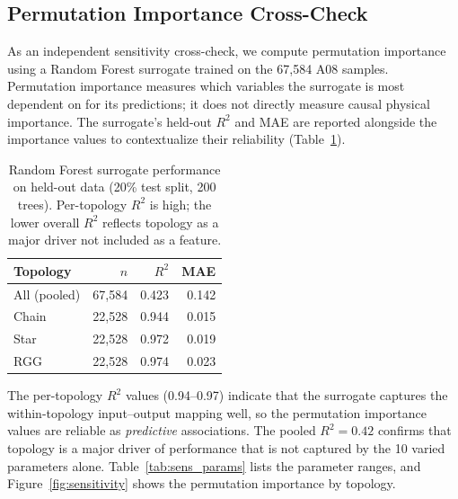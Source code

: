 \documentclass[quantumrep,article,submit,moreauthors]{Definitions/mdpi}
\begin{document}
\subsection{Permutation Importance Cross-Check}

As an independent sensitivity cross-check, we compute permutation importance using a Random Forest surrogate trained on the 67{,}584 A08 samples. Permutation importance measures which variables the surrogate is most dependent on for its predictions; it does not directly measure causal physical importance. The surrogate's held-out $R^2$ and MAE are reported alongside the importance values to contextualize their reliability (Table~\ref{tab:rf_r2}).

\begin{table}[htbp]
\centering
\caption{Random Forest surrogate performance on held-out data (20\% test split, 200 trees). Per-topology $R^2$ is high; the lower overall $R^2$ reflects topology as a major driver not included as a feature.}
\label{tab:rf_r2}
\begin{tabular}{lrrr}
\toprule
Topology & $n$ & $R^2$ & MAE \\
\midrule
All (pooled) & 67{,}584 & 0.423 & 0.142 \\
Chain & 22{,}528 & 0.944 & 0.015 \\
Star & 22{,}528 & 0.972 & 0.019 \\
RGG & 22{,}528 & 0.974 & 0.023 \\
\bottomrule
\end{tabular}
\end{table}

The per-topology $R^2$ values (0.94--0.97) indicate that the surrogate captures the within-topology input--output mapping well, so the permutation importance values are reliable as \emph{predictive} associations. The pooled $R^2 = 0.42$ confirms that topology is a major driver of performance that is not captured by the 10 varied parameters alone. Table~\ref{tab:sens_params} lists the parameter ranges, and Figure~\ref{fig:sensitivity} shows the permutation importance by topology.
\end{document}
